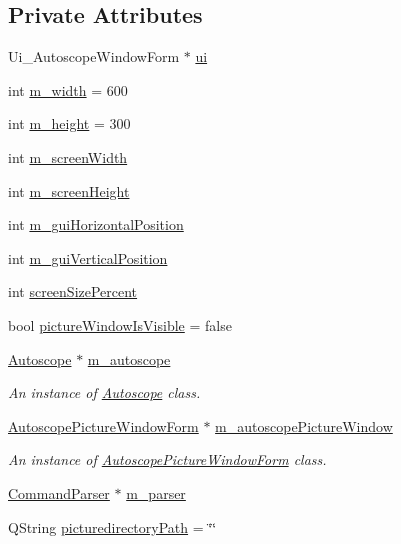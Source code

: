 \subsection*{Private Attributes}
\begin{DoxyCompactItemize}
\item 
Ui\+\_\+\+Autoscope\+Window\+Form $\ast$ \hyperlink{class_autoscope_window_form_a9a937e00b0a9a4d16001b5da7449a07f}{ui}
\item 
int \hyperlink{class_autoscope_window_form_a494735b51d06bfa71d5954da50f51d3d}{m\+\_\+width} = 600
\item 
int \hyperlink{class_autoscope_window_form_a6dbb17c9dce12f2a8775e1510b0139e9}{m\+\_\+height} = 300
\item 
int \hyperlink{class_autoscope_window_form_a6a4204832945288b420ae248dc69ae08}{m\+\_\+screen\+Width}
\item 
int \hyperlink{class_autoscope_window_form_a60c88c0b6f8f7f5eac46680a7b00b59e}{m\+\_\+screen\+Height}
\item 
int \hyperlink{class_autoscope_window_form_a729b0f3174ac22f142a78dbc6d2677be}{m\+\_\+gui\+Horizontal\+Position}
\item 
int \hyperlink{class_autoscope_window_form_abfd03b3848ab390f59cfe1778595bcb8}{m\+\_\+gui\+Vertical\+Position}
\item 
int \hyperlink{class_autoscope_window_form_a4e436f5aca95b4d503ae9c5fe28ec8ed}{screen\+Size\+Percent}
\item 
bool \hyperlink{class_autoscope_window_form_a0a27bb2073810e25351a6dc773f128df}{picture\+Window\+Is\+Visible} = false
\item 
\hyperlink{class_autoscope}{Autoscope} $\ast$ \hyperlink{class_autoscope_window_form_a73df08489686c1d7f72d0e1d7f3bfee3}{m\+\_\+autoscope}
\begin{DoxyCompactList}\small\item\em An instance of \hyperlink{class_autoscope}{Autoscope} class. \end{DoxyCompactList}\item 
\hyperlink{class_autoscope_picture_window_form}{Autoscope\+Picture\+Window\+Form} $\ast$ \hyperlink{class_autoscope_window_form_a859556308e579b3c83862e943684f859}{m\+\_\+autoscope\+Picture\+Window}
\begin{DoxyCompactList}\small\item\em An instance of \hyperlink{class_autoscope_picture_window_form}{Autoscope\+Picture\+Window\+Form} class. \end{DoxyCompactList}\item 
\hyperlink{class_command_parser}{Command\+Parser} $\ast$ \hyperlink{class_autoscope_window_form_a2877cb19ca1705acd6860f3edf70cfe2}{m\+\_\+parser}
\item 
Q\+String \hyperlink{class_autoscope_window_form_a2e8d5a43841204d931654d255e194e60}{picturedirectory\+Path} = \char`\"{}\char`\"{}
\end{DoxyCompactItemize}


